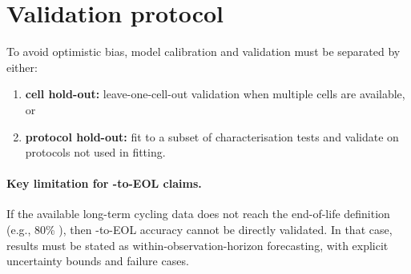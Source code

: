 \section{Validation protocol}
\label{sec:validation}

To avoid optimistic bias, model calibration and validation must be separated
by either:
\begin{enumerate}
  \item \textbf{cell hold-out:} leave-one-cell-out validation when multiple
  cells are available, or
  \item \textbf{protocol hold-out:} fit to a subset of characterisation tests
  and validate on protocols not used in fitting.
\end{enumerate}

\paragraph{Key limitation for \RUL-to-EOL claims.}
If the available long-term cycling data does not reach the end-of-life
definition (e.g., 80\% \SOH), then \RUL-to-EOL accuracy cannot be directly
validated. In that case, results must be stated as within-observation-horizon
\SOH forecasting, with explicit uncertainty bounds and failure cases.


